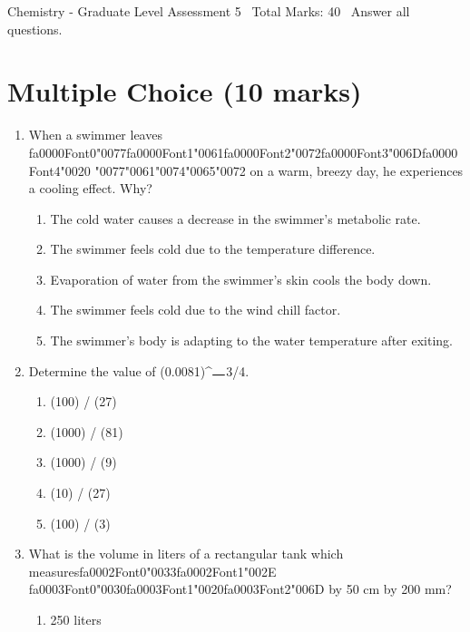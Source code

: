 \documentclass[12pt]{article}
\begin{document}
\begin{center}
Chemistry - Graduate Level Assessment 5 \
Total Marks: 40 \
Answer all questions.
\end{center}

\section*{Multiple Choice (10 marks)}
\begin{enumerate}[label=\arabic*.]
\item When a swimmer leaves {\csname fa0000Font0\endcsname\char"0077}{\csname fa0000Font1\endcsname\char"0061}{\csname fa0000Font2\endcsname\char"0072}{\csname fa0000Font3\endcsname\char"006D}{\csname fa0000Font4\endcsname\char"0020} {\char"0077}{\char"0061}{\char"0074}{\char"0065}{\char"0072} on a warm, breezy day, he experiences a cooling effect.
Why?
\begin{enumerate}[label=(\alph*)]
    \item The cold water causes a decrease in the swimmer's metabolic rate.
    \item The swimmer feels cold due to the temperature difference.
    \item Evaporation of water from the swimmer's skin cools the body down.
    \item The swimmer feels cold due to the wind chill factor.
    \item The swimmer's body is adapting to the water temperature after exiting.
\end{enumerate}
\item Determine the value of (0.0081)\^{}\ensuremath{\rule{1em}{1pt}}3/4.
\begin{enumerate}[label=(\alph*)]
    \item (100) / (27)
    \item (1000) / (81)
    \item (1000) / (9)
    \item (10) / (27)
    \item (100) / (3)
\end{enumerate}
\item What is the volume in liters of a rectangular tank which measures{\csname fa0002Font0\endcsname\char"0033}{\csname fa0002Font1\endcsname\char"002E} {\csname fa0003Font0\endcsname\char"0030}{\csname fa0003Font1\endcsname\char"0020}{\csname fa0003Font2\endcsname\char"006D} by 50 cm by 200 mm?
\begin{enumerate}[label=(\alph*)]
    \item 250 liters

\end{enumerate}
\end{enumerate}
\end{document}
